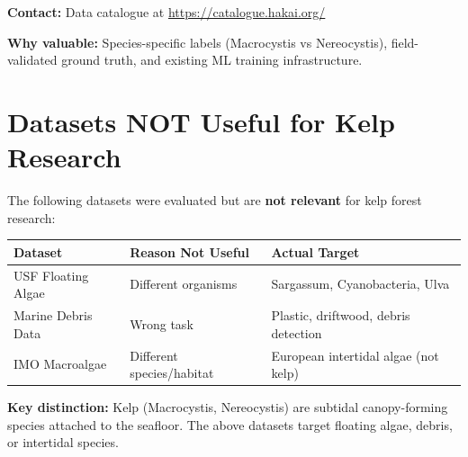\documentclass[11pt]{article}
\begin{document}
\textbf{Contact:} Data catalogue at \url{https://catalogue.hakai.org/}

\textbf{Why valuable:} Species-specific labels (Macrocystis vs Nereocystis), field-validated ground truth, and existing ML training infrastructure.

\section{Datasets NOT Useful for Kelp Research}

The following datasets were evaluated but are \textbf{not relevant} for kelp forest research:

\begin{center}
\begin{tabular}{lll}
\toprule
\textbf{Dataset} & \textbf{Reason Not Useful} & \textbf{Actual Target} \\
\midrule
USF Floating Algae & Different organisms & Sargassum, Cyanobacteria, Ulva \\
Marine Debris Data & Wrong task & Plastic, driftwood, debris detection \\
IMO Macroalgae & Different species/habitat & European intertidal algae (not kelp) \\
\bottomrule
\end{tabular}
\end{center}

\textbf{Key distinction:} Kelp (Macrocystis, Nereocystis) are subtidal canopy-forming species attached to the seafloor. The above datasets target floating algae, debris, or intertidal species.
\end{document}
